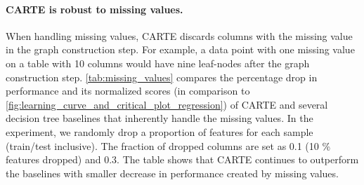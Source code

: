 \documentclass{article}
\theoremstyle{plain}
\theoremstyle{definition}
\theoremstyle{remark}
\begin{document}
\paragraph{CARTE is robust to missing values.}
When handling missing values, CARTE discards columns with the missing value in the graph construction step. For example, a data point with one missing value on a table with 10 columns would have nine leaf-nodes after the graph construction step. \autoref{tab:missing_values} compares the percentage drop in performance and its normalized scores (in comparison to \autoref{fig:learning_curve_and_critical_plot_regression}) of CARTE and several decision tree baselines that inherently handle the missing values. In the experiment, we randomly drop a proportion of features for each sample (train/test inclusive). The fraction of dropped columns are set as 0.1 (10 \% features dropped) and 0.3. The table shows that CARTE continues to outperform the baselines with smaller decrease in performance created by missing values.
\end{document}
